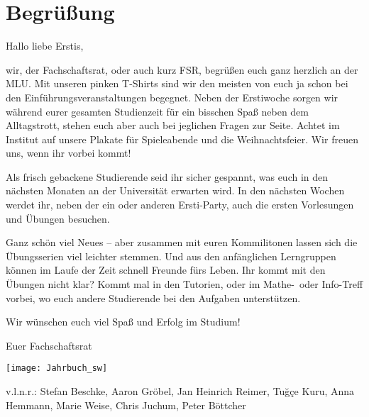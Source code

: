 \section{Begrüßung}

\begin{spacing}{1.65}
    \setlength{\parskip}{1.65ex}

    Hallo liebe Erstis,

    wir, der Fachschaftsrat, oder auch kurz FSR, 
    begrüßen euch ganz herzlich an der MLU.
    Mit unseren pinken T-Shirts sind wir den meisten 
    von euch ja schon bei den Einführungsveranstaltungen begegnet.
    Neben der Erstiwoche sorgen wir während eurer gesamten Studienzeit
    für ein bisschen Spaß neben dem Alltagstrott, 
    stehen euch aber auch bei jeglichen Fragen zur Seite.
    Achtet im Institut auf unsere Plakate für Spieleabende und die Weihnachtsfeier.
    Wir freuen uns, wenn ihr vorbei kommt!

    Als frisch gebackene Studierende seid ihr sicher gespannt, 
    was euch in den nächsten Monaten 
    an der Universität erwarten wird. 
    In den nächsten Wochen werdet ihr, 
    neben der ein oder anderen Ersti-Party,
    auch die ersten Vorlesungen und Übungen besuchen.

    Ganz schön viel Neues -- 
    aber zusammen mit euren Kommilitonen 
    lassen sich die Übungsserien viel leichter stemmen.
    Und aus den anfänglichen Lerngruppen 
    können im Laufe der Zeit schnell Freunde fürs Leben.
    Ihr kommt mit den Übungen nicht klar? 
    Kommt mal in den Tutorien, 
    oder im Mathe-~oder Info-Treff vorbei, 
    wo euch andere Studierende bei den Aufgaben unterstützen.

    Wir wünschen euch viel Spaß und Erfolg im Studium!

    Euer Fachschaftsrat
\end{spacing}

\begin{center}
    \texttt{[image: Jahrbuch\_sw]}
\end{center}%
v.l.n.r.: 
Stefan Beschke,
Aaron Gröbel, 
Jan Heinrich Reimer,  
Tuğçe Kuru, 
Anna Hemmann,
Marie Weise, 
Chris Juchum,  
Peter Böttcher
